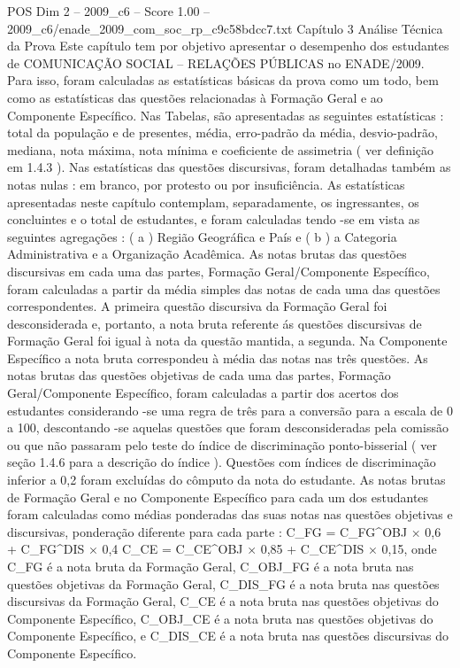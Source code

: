 \begin{textsample}{POS Dim 2 – 2009\_c6 – Score 1.00 – 2009\_c6/enade\_2009\_com\_soc\_rp\_c9c58bdcc7.txt}  \label{ex:f2_pos_295}
Capítulo 3 Análise Técnica da Prova Este capítulo tem por objetivo apresentar o desempenho dos estudantes de COMUNICAÇÃO SOCIAL – RELAÇÕES PÚBLICAS no ENADE/2009.
Para isso, foram calculadas as estatísticas básicas da prova como um todo, bem como as estatísticas das questões relacionadas à Formação Geral e ao Componente Específico.
Nas Tabelas, são apresentadas as seguintes estatísticas : total da população e de presentes, média, erro-padrão da média, desvio-padrão, mediana, nota máxima, nota mínima e coeficiente de assimetria ( ver definição em 1.4.3 ).
Nas estatísticas das questões discursivas, foram detalhadas também as notas nulas : em branco, por protesto ou por insuficiência.
As estatísticas apresentadas neste capítulo contemplam, separadamente, os ingressantes, os concluintes e o total de estudantes, e foram calculadas tendo -se em vista as seguintes agregações : ( a ) Região Geográfica e País e ( b ) a Categoria Administrativa e a Organização Acadêmica.
As notas brutas das questões discursivas em cada uma das partes, Formação Geral/Componente Específico, foram calculadas a partir da média simples das notas de cada uma das questões correspondentes.
A primeira questão discursiva da Formação Geral foi desconsiderada e, portanto, a nota bruta referente ás questões discursivas de Formação Geral foi igual à nota da questão mantida, a segunda.
Na Componente Específico a nota bruta correspondeu à média das notas nas três questões.
As notas brutas das questões objetivas de cada uma das partes, Formação Geral/Componente Específico, foram calculadas a partir dos acertos dos estudantes considerando -se uma regra de três para a conversão para a escala de 0 a 100, descontando -se aquelas questões que foram desconsideradas pela comissão ou que não passaram pelo teste do índice de discriminação ponto-bisserial ( ver seção 1.4.6 para a descrição do índice ).
Questões com índices de discriminação inferior a 0,2 foram excluídas do cômputo da nota do estudante.
As notas brutas de Formação Geral e no Componente Específico para cada um dos estudantes foram calculadas como médias ponderadas das suas notas nas questões objetivas e discursivas, ponderação diferente para cada parte : C\_FG = C\_FG\textasciicircum{}OBJ × 0,6 + C\_FG\textasciicircum{}DIS × 0,4 C\_CE = C\_CE\textasciicircum{}OBJ × 0,85 + C\_CE\textasciicircum{}DIS × 0,15, onde C\_FG é a nota bruta da Formação Geral, C\_OBJ\_FG é a nota bruta nas questões objetivas da Formação Geral, C\_DIS\_FG é a nota bruta nas questões discursivas da Formação Geral, C\_CE é a nota bruta nas questões objetivas do Componente Específico, C\_OBJ\_CE é a nota bruta nas questões objetivas do Componente Específico, e C\_DIS\_CE é a nota bruta nas questões discursivas do Componente Específico.

\end{textsample}

